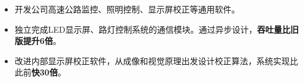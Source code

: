 \documentclass[11pt,a4paper]{moderncv/moderncv}
\begin{document}
{
\begin{itemize}
	\item 开发公司高速公路监控、照明控制、显示屏校正等通用软件。
	\item 独立完成LED显示屏、路灯控制系统的通信模块。通过异步设计，\textbf{吞吐量比旧版提升6倍}。
	\item 改进内部显示屏校正软件，从成像和视觉原理出发设计校正算法，系统实现比此前\textbf{快30倍}。
\end{itemize}
}

{
}

\end{document}
